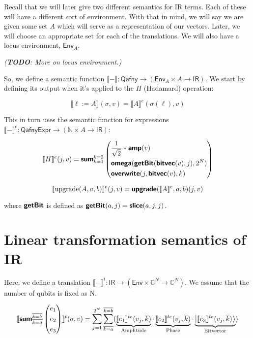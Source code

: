 \documentclass[runningheads]{llncs}
\newcommand {\ra} {\rightarrow}
\newcommand {\Env} {\textsf{Env}}
\newcommand {\sem} [1] {\llbracket #1 \rrbracket}
\newcommand {\semE} [1] {\sem{#1}^e}
\newcommand {\Tsem} [1] {\sem{#1}^t}
\newcommand {\TsemE} [1] {\sem{#1}^{te}}
\newcommand {\ket}[1]{\ensuremath{\left|#1\right\rangle}}
\newcommand {\ir} [1] {\textsf{\textbf{#1}}}
\newcommand {\IRep} {\textsf{IR}}
\newcommand {\irUpgrade} {\ir{upgrade}}
\newcommand {\irSum} {\ir{sum}}
\newcommand {\irOverwrite} {\ir{overwrite}}
\newcommand {\irSlice} {\ir{slice}}
\newcommand {\irGetBit} {\ir{getBit}}
\newcommand {\irAmp} {\ir{amp}}
\newcommand {\irBV} {\ir{bitvec}}
\newcommand {\irOmega} {\ir{omega}}
\newcommand {\qafnyUpgrade} {\textnormal{upgrade}}
\newcommand {\Qafny} {\textsf{Qafny}}
\newcommand {\QafnyExpr} {\textsf{QafnyExpr}}
\begin{document}
Recall that we will later give two different semantics for IR terms. Each of these will have a different sort of environment. With that in mind, we will say we are given some set $A$ which will serve as a representation of our vectors. Later, we will choose an appropriate set for each of the translations. We will also have a locus environment, $\Env_A$.

\textit{(\textbf{TODO}: More on locus environment.)}

So, we define a semantic function $\sem{-} : \Qafny \ra (\Env_A \times A \ra \IRep)$. We start by defining its output when it's applied to the $H$ (Hadamard) operation:

\[
  \sem{\ell := A}(\sigma, v) = \semE{A}(\sigma(\ell), v)
\]

This in turn uses the semantic function for expressions $\semE{-} : \QafnyExpr \ra (\mathbb{N} \times A \ra \IRep)$:

\[
  \semE{H}(j, v) = 
  \irSum_{k=1}^{k=2}
    \left(\begin{aligned}
      &\frac{1}{\sqrt{2}} * \irAmp(v)\\
      &\irOmega(\irGetBit(\irBV(v), j), 2^N)\\
      &\irOverwrite(j, \irBV(v), k)
      \end{aligned}\right)
\]

\[
  \semE{\qafnyUpgrade(A, a, b)}(j, v) = \irUpgrade(\semE{A}, a, b)(j, v)
\]

where $\irGetBit$ is defined as $\irGetBit(a, j) = \irSlice(a, j, j)$.

\section{Linear transformation semantics of IR}

Here, we define a translation $\Tsem{-} : \IRep \ra (\Env \times \mathbb{C}^N \ra \mathbb{C}^N)$. We assume that the number of qubits is fixed as N.

\[
  \Tsem{\irSum_{\overline{k=a}}^{\overline{k=b}}
    \left(\begin{aligned}
      &e_1\\
      &e_2\\
      &e_3
    \end{aligned}\right)}(\sigma, v)
    =
    \sum_{j=1}^{2^N}\sum_{\overline{k=a}}^{\overline{k=b}}
      (\underbrace{\TsemE{e_1}(v_j, \overline{k})}_{\textnormal{Amplitude}} \cdot \underbrace{\TsemE{e_2}(v_j, \overline{k})}_{\textnormal{Phase}} \cdot \underbrace{\ket{\TsemE{e_3}(v_j, \overline{k})}}_{\textnormal{Bitvector}})
\]
\end{document}
